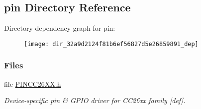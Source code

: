 \subsection{pin Directory Reference}
\label{dir_32a9d2124f81b6ef56827d5e26859891}
Directory dependency graph for pin\-:
\nopagebreak
\begin{figure}[H]
\begin{center}
\leavevmode
\texttt{[image: dir\_32a9d2124f81b6ef56827d5e26859891\_dep]}
\end{center}
\end{figure}
\subsubsection*{Files}
\begin{DoxyCompactItemize}
\item 
file \hyperlink{_p_i_n_c_c26_x_x_8h}{P\-I\-N\-C\-C26\-X\-X.\-h}
\begin{DoxyCompactList}\small\item\em Device-\/specific pin \& G\-P\-I\-O driver for C\-C26xx family \mbox{[}def\mbox{]}. \end{DoxyCompactList}\end{DoxyCompactItemize}
